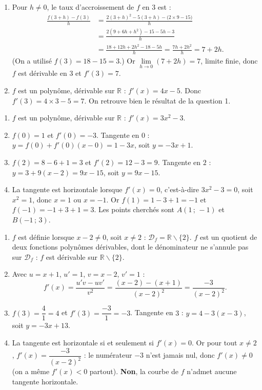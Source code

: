 \documentclass[11pt]{article}
\def\setminus{\mathbin{\backslash}}\let\smallsetminus\setminus
\begin{document}
\begin{corrige}
\begin{enumerate}
\item Pour $h\neq 0$, le taux d'accroissement de $f$ en $3$ est :
\begin{align*}
\frac{f(3+h)-f(3)}{h}&=\frac{2(3+h)^2-5(3+h)-\bigl(2\times 9-15\bigr)}{h}\\
&=\frac{2(9+6h+h^2)-15-5h-3}{h}\\
&=\frac{18+12h+2h^2-18-5h}{h}=\frac{7h+2h^2}{h}=7+2h.
\end{align*}
(On a utilisé $f(3)=18-15=3$.) Or $\lim\limits_{h\to 0}(7+2h)=7$, limite finie, donc $f$ est dérivable en $3$ et $\boxed{f'(3)=7}$.
\item $f$ est un polynôme, dérivable sur $\mathbb{R}$ : $f'(x)=4x-5$. Donc $f'(3)=4\times 3-5=7$. On retrouve bien le résultat de la question 1.
\end{enumerate}
\end{corrige}

\begin{corrige}
\begin{enumerate}
\item $f$ est un polynôme, dérivable sur $\mathbb{R}$ : $f'(x)=3x^2-3$.
\item $f(0)=1$ et $f'(0)=-3$. Tangente en $0$ : $y=f(0)+f'(0)(x-0)=1-3x$, soit $\boxed{y=-3x+1}$.
\item $f(2)=8-6+1=3$ et $f'(2)=12-3=9$. Tangente en $2$ : $y=3+9(x-2)=9x-15$, soit $\boxed{y=9x-15}$.
\item La tangente est horizontale lorsque $f'(x)=0$, c'est-à-dire $3x^2-3=0$, soit $x^2=1$, donc $x=1$ ou $x=-1$. Or $f(1)=1-3+1=-1$ et $f(-1)=-1+3+1=3$. Les points cherchés sont $\boxed{A(1\,;\,-1)}$ et $\boxed{B(-1\,;\,3)}$.
\end{enumerate}
\end{corrige}

\begin{corrige}
\begin{enumerate}
\item $f$ est définie lorsque $x-2\neq 0$, soit $x\neq 2$ : $\mathcal{D}_f=\mathbb{R}\setminus\{2\}$. $f$ est un quotient de deux fonctions polynômes dérivables, dont le dénominateur ne s'annule pas sur $\mathcal{D}_f$ : $f$ est dérivable sur $\mathbb{R}\setminus\{2\}$.
\item Avec $u=x+1$, $u'=1$, $v=x-2$, $v'=1$ :
\[ f'(x)=\frac{u'v-uv'}{v^2}=\frac{(x-2)-(x+1)}{(x-2)^2}=\frac{-3}{(x-2)^2}. \]
\item $f(3)=\dfrac{4}{1}=4$ et $f'(3)=\dfrac{-3}{1}=-3$. Tangente en $3$ : $y=4-3(x-3)$, soit $\boxed{y=-3x+13}$.
\item La tangente est horizontale si et seulement si $f'(x)=0$. Or pour tout $x\neq 2$, $f'(x)=\dfrac{-3}{(x-2)^2}$ : le numérateur $-3$ n'est jamais nul, donc $f'(x)\neq 0$ (on a même $f'(x)<0$ partout). \textbf{Non}, la courbe de $f$ n'admet aucune tangente horizontale.
\end{enumerate}
\end{corrige}
\end{document}
